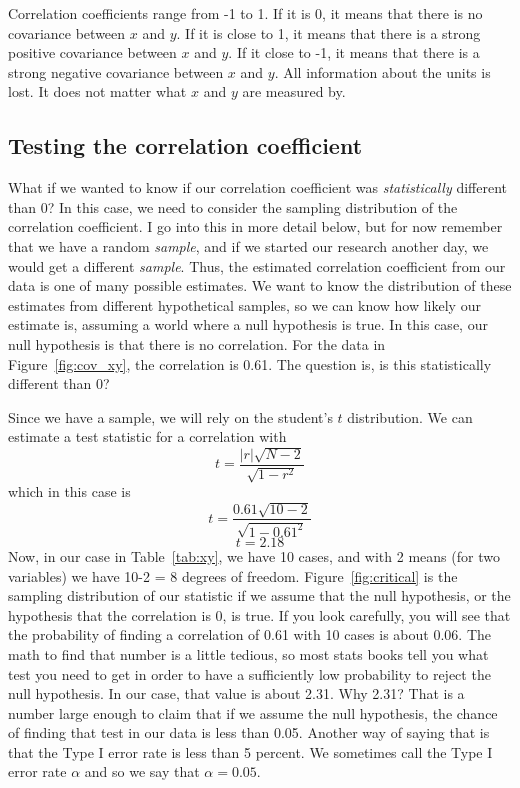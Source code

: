 Correlation coefficients range from -1 to 1. If it is 0, it means that there is no covariance between $x$ and $y$. If it is close to 1, it means that there is a strong positive covariance between $x$ and $y$. If it close to -1, it means that there is a strong negative covariance between $x$ and $y$. All information about the units is lost. It does not matter what $x$ and $y$ are measured by.
\subsection{Testing the correlation coefficient}
\label{sec:introhypo}
What if we wanted to know if our correlation coefficient was {\it statistically} different than 0? In this case, we need to consider the sampling distribution of the correlation coefficient. I go into this in more detail below, but for now remember that we have a random {\it sample}, and if we started our research another day, we would get a different {\it sample}. Thus, the estimated correlation coefficient from our data is one of many possible estimates. We want to know the distribution of these estimates from different hypothetical samples, so we can know how likely our estimate is, assuming a world where a null hypothesis is true. In this case, our null hypothesis is that there is no correlation. For the data in Figure~\ref{fig:cov_xy}, the correlation is 0.61. The question is, is this statistically different than 0?

Since we have a sample, we will rely on the student's $t$ distribution. We can estimate a test statistic for a correlation with
\begin{equation}
t = \frac{|r|\sqrt{N-2}}{\sqrt{1-r^2}}
\end{equation}
which in this case is
\[
t = \frac{0.61\sqrt{10-2}}{\sqrt{1-0.61^2}}
\]
\[
t = 2.18
\]
Now, in our case in Table~\ref{tab:xy}, we have 10 cases, and with 2 means (for two variables) we have 10-2 = 8 degrees of freedom. Figure~\ref{fig:critical} is the sampling distribution of our statistic if we assume that the null hypothesis, or the hypothesis that the correlation is 0, is true. If you look carefully, you will see that the probability of finding a correlation of 0.61 with 10 cases is about 0.06. The math to find that number is a little tedious, so most stats books tell you what test you need to get in order to have a sufficiently low probability to reject the null hypothesis. In our case, that value is about 2.31. Why 2.31? That is a number large enough to claim that if we assume the null hypothesis, the chance of finding that test in our data is less than 0.05. Another way of saying that is that the Type I error rate is less than 5 percent. We sometimes call the Type I error rate $\alpha$ and so we say that $\alpha = 0.05$.


